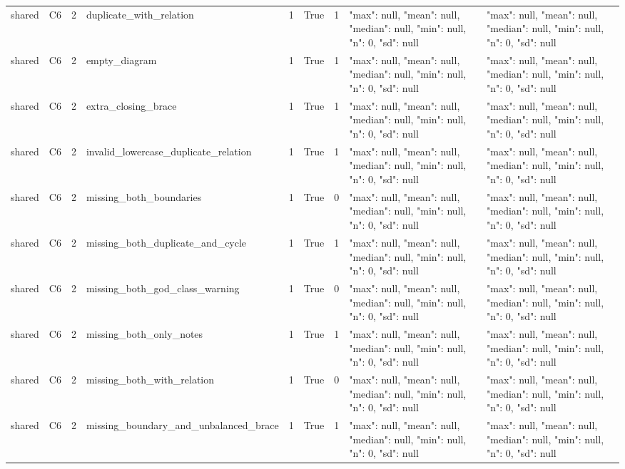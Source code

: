 \begin{tabular}{lllllllll}
shared & C6 & 2 & duplicate\_with\_relation & 1 & True & 1 & {"max": null, "mean": null, "median": null, "min": null, "n": 0, "sd": null} & {"max": null, "mean": null, "median": null, "min": null, "n": 0, "sd": null} \\
shared & C6 & 2 & empty\_diagram & 1 & True & 1 & {"max": null, "mean": null, "median": null, "min": null, "n": 0, "sd": null} & {"max": null, "mean": null, "median": null, "min": null, "n": 0, "sd": null} \\
shared & C6 & 2 & extra\_closing\_brace & 1 & True & 1 & {"max": null, "mean": null, "median": null, "min": null, "n": 0, "sd": null} & {"max": null, "mean": null, "median": null, "min": null, "n": 0, "sd": null} \\
shared & C6 & 2 & invalid\_lowercase\_duplicate\_relation & 1 & True & 1 & {"max": null, "mean": null, "median": null, "min": null, "n": 0, "sd": null} & {"max": null, "mean": null, "median": null, "min": null, "n": 0, "sd": null} \\
shared & C6 & 2 & missing\_both\_boundaries & 1 & True & 0 & {"max": null, "mean": null, "median": null, "min": null, "n": 0, "sd": null} & {"max": null, "mean": null, "median": null, "min": null, "n": 0, "sd": null} \\
shared & C6 & 2 & missing\_both\_duplicate\_and\_cycle & 1 & True & 1 & {"max": null, "mean": null, "median": null, "min": null, "n": 0, "sd": null} & {"max": null, "mean": null, "median": null, "min": null, "n": 0, "sd": null} \\
shared & C6 & 2 & missing\_both\_god\_class\_warning & 1 & True & 0 & {"max": null, "mean": null, "median": null, "min": null, "n": 0, "sd": null} & {"max": null, "mean": null, "median": null, "min": null, "n": 0, "sd": null} \\
shared & C6 & 2 & missing\_both\_only\_notes & 1 & True & 1 & {"max": null, "mean": null, "median": null, "min": null, "n": 0, "sd": null} & {"max": null, "mean": null, "median": null, "min": null, "n": 0, "sd": null} \\
shared & C6 & 2 & missing\_both\_with\_relation & 1 & True & 0 & {"max": null, "mean": null, "median": null, "min": null, "n": 0, "sd": null} & {"max": null, "mean": null, "median": null, "min": null, "n": 0, "sd": null} \\
shared & C6 & 2 & missing\_boundary\_and\_unbalanced\_brace & 1 & True & 1 & {"max": null, "mean": null, "median": null, "min": null, "n": 0, "sd": null} & {"max": null, "mean": null, "median": null, "min": null, "n": 0, "sd": null} \\

\end{tabular}
